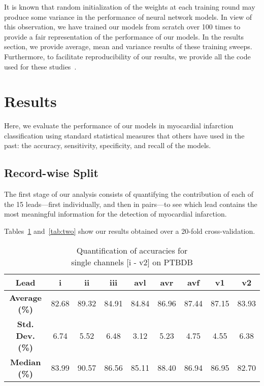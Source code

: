 \documentclass{svproc}
\begin{document}
It is known that random initialization of the weights at each training round may produce some variance in the performance of neural network models. In view of this observation, we have trained our models from scratch over 100 times to provide a fair representation of the performance of our models. In the results section, we provide average, mean and variance results of these training sweeps. Furthermore, to facilitate reproducibility of our results, we provide all the code used for these studies~\cite{heartrepo}.

\section{Results} 
\label{sec:results}

Here, we evaluate the performance of our models in myocardial infarction classification using standard statistical measures that others have used in the past: the accuracy, sensitivity, specificity, and recall of the models.

\subsection{Record-wise Split}

The first stage of our analysis consists of quantifying the contribution of each of the 15 leads---first individually, and then in pairs---to see which lead contains the most meaningful information for the detection of myocardial infarction. 

Tables~\ref{tab:one} and~\ref{tab:two} show our results obtained over a 20-fold cross-validation.

\renewcommand{\arraystretch}{1.2}
\begin{table}[hbt!]\centering
\caption{Quantification of accuracies for \\single channels [i - v2] on PTBDB}
\begin{tabular}{c|c|c|c|c|c|c|c|c}
\textbf{Lead}          & i  & ii & iii & avl & avr & avf  & v1 & v2\\ \hline
\textbf{Average (\%)} & 82.68 & 89.32 & 84.91  & 84.84  & 86.96 & 87.44 & 87.15 & 83.93 \\ 
\textbf{Std. Dev. (\%)} & 6.74 & 5.52 & 6.48  & 3.12  & 5.23 & 4.75 & 4.55 & 6.38 \\ 
\textbf{Median (\%)} & 83.99 & 90.57 & 86.56  & 85.11  & 88.40 & 86.94 & 86.95 & 82.70
\label{tab:one}
\end{tabular}
\end{table}
\end{document}
